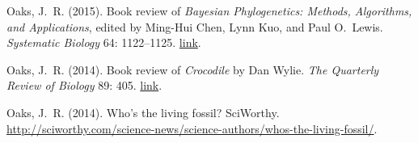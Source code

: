 \myHangIndent
Oaks, J.\ R.
(2015).
Book review of \emph{Bayesian Phylogenetics: Methods, Algorithms, and Applications}, edited by Ming-Hui Chen, Lynn Kuo, and Paul O.\ Lewis.
\emph{Systematic Biology} 64: 1122--1125. \href{http://dx.doi.org/doi:10.1093/sysbio/syv063}{link}.

\myHangIndent
Oaks, J.\ R.
(2014).
Book review of \emph{Crocodile} by Dan Wylie.
\emph{The Quarterly Review of Biology} 89: 405. \href{http://dx.doi.org/10.1086/678660}{link}.

\myHangIndent
Oaks, J.\ R.
(2014).
Who's the living fossil?
SciWorthy.
\href{http://sciworthy.com/science-news/science-authors/whos-the-living-fossil/}{
    http://sciworthy.com/\allowbreak{}science-news/\allowbreak{}science-authors/\allowbreak{}whos-the-living-fossil/}.

